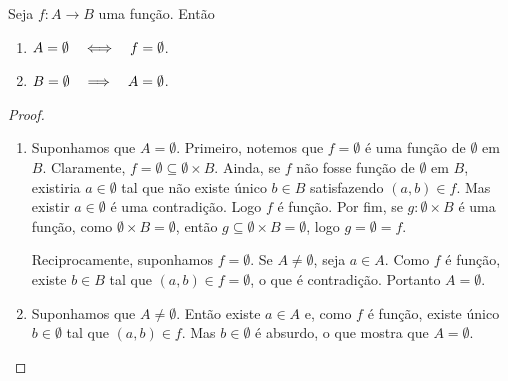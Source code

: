 \begin{prop}
Seja $f: A \to B$ uma função. Então
	\begin{enumerate}
	\item $A=\emptyset \quad \Longleftrightarrow \quad f=\emptyset$.
	\item $B=\emptyset \quad \Longrightarrow \quad A=\emptyset$.
	\end{enumerate}
\end{prop}
\begin{proof}
	\begin{enumerate}
	\item Suponhamos que $A=\emptyset$. Primeiro, notemos que $f=\emptyset$ é uma função de $\emptyset$ em $B$. Claramente, $f = \emptyset \subseteq \emptyset \times B$. Ainda, se $f$ não fosse função de $\emptyset$ em $B$, existiria $a \in \emptyset$ tal que não existe único $b \in B$ satisfazendo $(a,b) \in f$. Mas existir $a \in \emptyset$ é uma contradição. Logo $f$ é função. Por fim, se $g: \emptyset \times B$ é uma função, como $\emptyset \times B = \emptyset$, então $g \subseteq \emptyset \times B = \emptyset$, logo $g=\emptyset=f$.
	
Reciprocamente, suponhamos $f=\emptyset$. Se $A \neq \emptyset$, seja $a \in A$. Como $f$ é função, existe $b \in B$ tal que $(a,b) \in f=\emptyset$, o que é contradição. Portanto $A=\emptyset$.
	
	\item Suponhamos que $A \neq \emptyset$. Então existe $a \in A$ e, como $f$ é função, existe único $b \in \emptyset$ tal que $(a,b) \in f$. Mas $b \in \emptyset$ é absurdo, o que mostra que $A = \emptyset$.
	\end{enumerate}
\end{proof}

